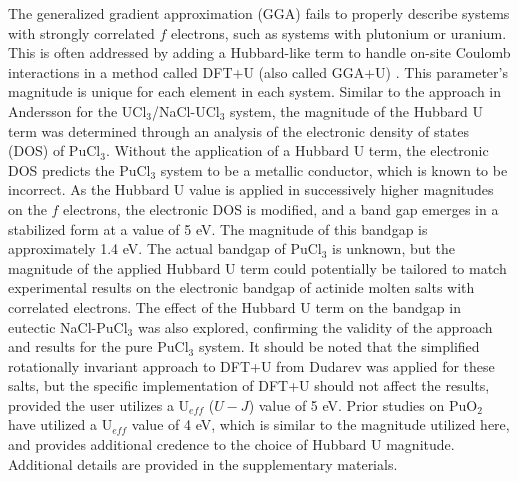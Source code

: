 \documentclass[review]{elsarticle}
\providecommand{\DIFaddtex}[1]{{\protect\color{blue} \sf #1}} %
\providecommand{\DIFaddbegin}{} %
\providecommand{\DIFaddend}{} %
\providecommand{\DIFadd}[1]{\texorpdfstring{\DIFaddtex{#1}}{#1}} %
\newcommand{\DIFaddincludegraphics}[2][]{{\color{blue}\fbox{\DIFOincludegraphics[#1]{#2}}}} %
\DeclareRobustCommand{\DIFaddbegin}{\DIFOaddbegin \let\includegraphics\DIFaddincludegraphics} %
\DeclareRobustCommand{\DIFaddend}{\DIFOaddend \let\includegraphics\DIFOincludegraphics} %
\begin{document}
The generalized gradient approximation (GGA) fails to properly describe systems with strongly correlated $f$ electrons, such as systems with plutonium or uranium. This is often addressed by adding a Hubbard-like term to handle on-site Coulomb interactions in a method called DFT+U (also called GGA+U) \cite{rohrbach2003electronic}. This parameter's magnitude is unique for each element in each system. Similar to the approach in Andersson \cite{ANDERSSON2022153836} for the UCl$_3$/NaCl-UCl$_3$ system, the magnitude of the Hubbard U term was determined through an analysis of the electronic density of states (DOS) of PuCl$_3$. Without the application of a Hubbard U term, the electronic DOS predicts the PuCl$_3$ system to be a metallic conductor, which is known to be incorrect. As the Hubbard U value is applied in successively higher magnitudes on the $f$ electrons, the electronic DOS is modified, and a band gap emerges in a stabilized form at a value of 5 eV. The magnitude of this bandgap is approximately 1.4 eV. The actual bandgap of PuCl$_3$ is unknown, but the magnitude of the applied Hubbard U term could potentially be tailored to match experimental results on the electronic bandgap of actinide molten salts with correlated electrons. The effect of the Hubbard U term on the bandgap in eutectic NaCl-PuCl$_3$ was also explored, confirming the validity of the approach and results for the pure PuCl$_3$ system. It should be noted that the simplified rotationally invariant approach to DFT+U from Dudarev \cite{Dudarev1998} was applied for these salts, but the specific implementation of DFT+U should not affect the results, provided the user utilizes a U$_{eff}$ ($U-J$) value of 5 eV. Prior studies on PuO$_2$ \cite{SUN2012} have utilized a U$_{eff}$ value of 4 eV, which is similar to the magnitude utilized here, and provides additional credence to the choice of Hubbard U magnitude. \DIFaddbegin \DIFadd{Additional details are provided in the supplementary materials.
}\DIFaddend 
\end{document}
